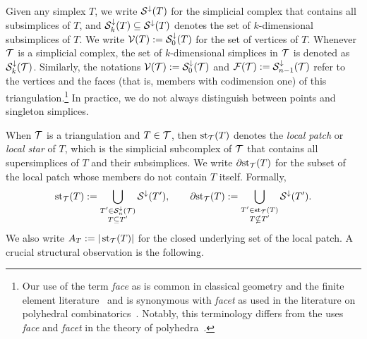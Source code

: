 \documentclass[10pt,a4paper]{article}
\begin{document}
Given any simplex $T$, we write ${\mathcal S}^{\downarrow}(T)$ for the simplicial complex that contains all subsimplices of $T$,
and ${\mathcal S}^{\downarrow}_{{k}}(T) \subseteq {\mathcal S}^{\downarrow}(T)$ denotes the set of $k$-dimensional subsimplices of $T$. 
We write ${\mathcal V}(T) := {\mathcal S}^{\downarrow}_{0}(T)$ for the set of vertices of $T$.
% 
Whenever ${\mathcal T}$ is a simplicial complex, 
the set of $k$-dimensional simplices in ${\mathcal T}$ is denoted as ${\mathcal S}^{\downarrow}_{{k}}({\mathcal T})$. 
Similarly, the notations ${\mathcal V}({\mathcal T}) := {\mathcal S}^{\downarrow}_{0}({\mathcal T})$ and ${\mathcal F}({\mathcal T}) := {\mathcal S}^{\downarrow}_{n-1}({\mathcal T})$ refer to the vertices and the faces (that is, members with codimension one) of this triangulation.\footnote{
    Our use of the term \emph{face} as is common in classical geometry and the finite element literature~\cite{brenner2008mathematical}
    and is synonymous with \emph{facet} as used in the literature on polyhedral combinatorics~\cite{schrijver1998theory}.
    Notably, this terminology differs from the uses \emph{face} and \emph{facet} in the theory of polyhedra~\cite{ziegler1995lectures}.
}
In practice, we do not always distinguish between points and singleton simplices. 

When ${\mathcal T}$ is a triangulation and $T \in {\mathcal T}$, then $\operatorname{st}_{{\mathcal T}}(T)$ denotes the \emph{local patch} or \emph{local star} of $T$, 
which is the simplicial subcomplex of ${\mathcal T}$ that contains all supersimplices of $T$ and their subsimplices. 
We write ${\partial \rm st}_{{\mathcal T}}(T)$ for the subset of the local patch whose members do not contain $T$ itself. 
Formally,
\begin{gather*}
    \operatorname{st}_{{\mathcal T}}(T) := \bigcup_{ \substack{ T' \in {\mathcal S}^{\downarrow}_{n}({\mathcal T}) \\ T \subseteq T' } } {\mathcal S}^{\downarrow}(T'),
    \qquad 
    {\partial \rm st}_{{\mathcal T}}(T) := \bigcup_{ \substack{ T' \in \operatorname{st}_{{\mathcal T}}(T) \\ T \nsubseteq T' } } {\mathcal S}^{\downarrow}(T').
\end{gather*}
We also write $A_T := | \operatorname{st}_{{\mathcal T}}(T) |$ for the closed underlying set of the local patch. 
A crucial structural observation is the following.
\end{document}
